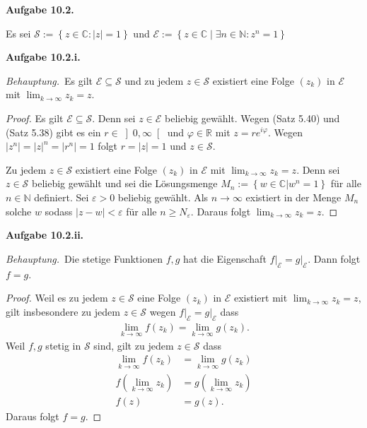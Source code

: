 \documentclass[12pt]{extarticle}
\newcommand{\beh}{\textit{Behauptung.}\ }
\newcommand{\aufgn}[1]{\textbf{Aufgabe #1.}}
\newcommand{\mg}[1]{\mathbb{#1}}
\newcommand{\mc}[1]{\mathcal{#1}}
\begin{document}
\aufgn{10.2}

Es sei
$\mc{S} := \left\{ z \in \mg{C} \colon \left| z \right|
  = 1 \right\}$ und
$\mc{E} := \left\{ z \in \mg{C} \mid \exists n \in
  \mg{N} \colon z^n = 1 \right\}$

\aufgn{10.2.i}

\beh Es gilt \(\mc{E} \subseteq \mc{S}\) und zu
jedem \(z \in \mc{S}\) existiert eine Folge \((z_k)\) in
\(\mc{E}\) mit \(\lim_{k \to \infty}{z_k} = z\).

\begin{proof}
  Es gilt \(\mc{E} \subseteq \mc{S}\).  Denn sei
  \(z \in \mc{E}\) beliebig gewählt.  Wegen (Satz
  5.40) und (Satz 5.38) gibt es ein
  \(r \in \left] 0, \infty \right[\) und \(\varphi \in \mg{R}\)
  mit \(z = re^{i \varphi}\).  Wegen
  $\left| z^n \right| = \left| z \right|^n = \left|
    r^n \right| = 1$ folgt
  \(r = \left| z \right| = 1\) und \(z \in \mc{S}\).

  Zu jedem \(z \in \mc{S}\) existiert eine Folge \((z_k)\)
  in \(\mc{E}\) mit \(\lim_{k \to \infty}{z_k} = z\).  Denn
  sei \(z \in \mc{S}\) beliebig gewählt und sei die
  Lösungsmenge
  \(M_n := \left\{ w \in \mg{C} | w^n = 1\right\}\) für
  alle \(n \in \mg{N}\) definiert.  Sei \(\varepsilon > 0\)
  beliebig gewählt.  Als \(n \to \infty\) existiert in der
  Menge \(M_n\) solche \(w\) sodass $\left| z - w \right| <
  \varepsilon$ für alle \(n \ge N_{\varepsilon}\).  Daraus
  folgt \(\lim_{k \to \infty}{z_k} = z\).
\end{proof}

\aufgn{10.2.ii}

\beh Die stetige Funktionen \(f, g\) hat die Eigenschaft
\(f\big|_{\mc{E}} = g\big|_{\mc{E}}\).  Dann folgt \(f=g\).

\begin{proof}
  Weil es zu jedem \(z \in \mc{S}\) eine Folge \((z_k)\) in
  \(\mc{E}\) existiert mit \(\lim_{k \to \infty}{z_k}=z\),
  gilt insbesondere zu jedem \(z \in \mc{S}\) wegen
  \(f\big|_{\mc{E}} = g\big|_{\mc{E}}\) dass
\begin{align*}
\lim_{k \to \infty}{f(z_k)} = \lim_{k \to \infty}{g(z_k)}.
\end{align*}
Weil \(f,g\) stetig in \(\mc{S}\) sind, gilt zu jedem
\(z \in \mc{S}\) dass
\begin{align*}
  \lim_{k \to \infty}{f(z_k)}
  &= \lim_{k \to \infty}{g(z_k)} \\
  f \left( \lim_{k \to \infty}{z_k} \right)
  &= g \left( \lim_{k \to \infty}{z_k} \right) \\
 f(z) &= g(z).
\end{align*}
Daraus folgt \(f = g\).
\end{proof}
\end{document}

